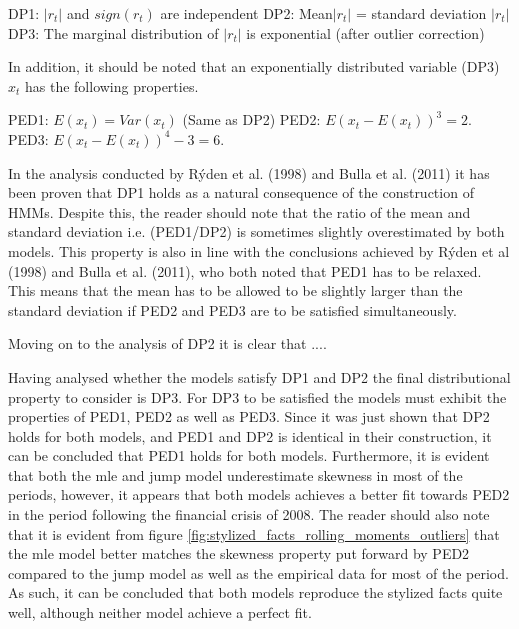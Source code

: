 DP1: $|r_t|$ and $sign(r_t)$ are independent\newline
DP2: Mean$|r_t|$ = standard deviation $|r_t|$ \newline
DP3: The marginal distribution of $|r_t|$ is exponential (after outlier correction)

In addition, it should be noted that an exponentially distributed variable (DP3) $x_t$ has the following properties.

PED1: $E(x_t) = Var(x_t)$ (Same as DP2) \newline
PED2: $E(x_t-E(x_t))^3 = 2.$ \newline
PED3: $E(x_t-E(x_t))^4 -3 = 6.$

In the analysis conducted by Rýden et al. (1998) and Bulla et al. (2011) it has been proven that DP1 holds as a natural consequence of the construction of HMMs. Despite this, the reader should note that the ratio of the mean and standard deviation i.e. (PED1/DP2) is sometimes slightly overestimated by both models. This property is also in line with the conclusions achieved by Rýden et al (1998) and Bulla et al. (2011), who both noted that PED1 has to be relaxed. This means that the mean has to be allowed to be slightly larger than the standard deviation if PED2 and PED3 are to be satisfied simultaneously.

Moving on to the analysis of DP2 it is clear that ....

Having analysed whether the models satisfy DP1 and DP2 the final distributional property to consider is DP3. For DP3 to be satisfied the models must exhibit the properties of PED1, PED2 as well as PED3. Since it was just shown that DP2 holds for both models, and PED1 and DP2 is identical in their construction, it can be concluded that PED1 holds for both models. Furthermore, it is evident that both the mle and jump model underestimate skewness in most of the periods, however, it appears that both models achieves a better fit towards PED2 in the period following the financial crisis of 2008. The reader should also note that it is evident from figure \ref{fig:stylized_facts_rolling_moments_outliers} that the mle model better matches the skewness property put forward by PED2 compared to the jump model as well as the empirical data for most of the period. As such, it can be concluded that both models reproduce the stylized facts quite well, although neither model achieve a perfect fit. 


